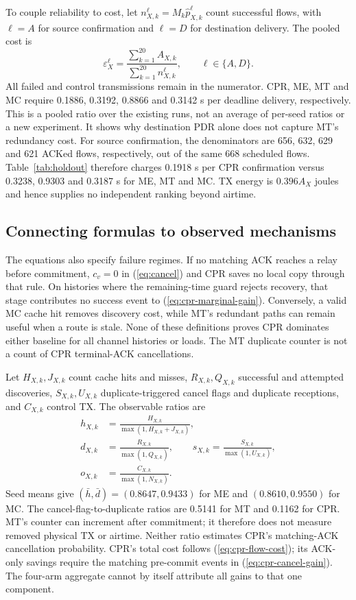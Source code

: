 \documentclass[conference,letterpaper,10pt]{IEEEtran}
\begin{document}
To couple reliability to cost, let
$n_{X,k}^{\ell}=M_k\widehat p_{X,k}^{\ell}$ count successful flows, with
$\ell=A$ for source confirmation and $\ell=D$ for destination delivery.
The pooled cost is
\begin{equation}
\varepsilon_X^\ell=
 \frac{\sum_{k=1}^{20}A_{X,k}}{\sum_{k=1}^{20}n_{X,k}^{\ell}},
 \qquad \ell\in\{A,D\}.
\label{eq:delivery-cost}
\end{equation}
All failed and control transmissions remain in the numerator. CPR, ME, MT
and MC require 0.1886, 0.3192, 0.8866 and 0.3142 s per deadline delivery,
respectively. This is a pooled ratio over the existing runs, not an average
of per-seed ratios or a new experiment. It shows why destination PDR alone
does not capture MT's redundancy cost.
For source confirmation, the denominators are 656, 632, 629 and 621 ACKed
flows, respectively, out of the same 668 scheduled flows. Table~\ref{tab:holdout}
therefore charges 0.1918 s per CPR confirmation versus 0.3238, 0.9303 and
0.3187 s for ME, MT and MC. TX energy is $0.396A_X$ joules and hence supplies
no independent ranking beyond airtime.

\subsection{Connecting formulas to observed mechanisms}
The equations also specify failure regimes. If no matching ACK reaches a
relay before commitment, $c_v=0$ in (\ref{eq:cancel}) and CPR saves no
local copy through that rule. On histories where the remaining-time guard
rejects recovery, that stage contributes no success event to
(\ref{eq:cpr-marginal-gain}). Conversely,
a valid MC cache hit removes discovery cost, while MT's redundant paths can
remain useful when a route is stale. None of these definitions proves CPR
dominates either baseline for all channel histories or loads.
The MT duplicate counter is not a count of CPR terminal-ACK cancellations.

Let $H_{X,k},J_{X,k}$ count cache hits and misses,
$R_{X,k},Q_{X,k}$ successful and attempted discoveries,
$S_{X,k},U_{X,k}$ duplicate-triggered cancel flags and duplicate receptions, and
$C_{X,k}$ control TX. The observable ratios are
\begin{equation}
\begin{aligned}
h_{X,k}&=\frac{H_{X,k}}{\max(1,H_{X,k}+J_{X,k})},\\
d_{X,k}&=\frac{R_{X,k}}{\max(1,Q_{X,k})},\qquad
s_{X,k}=\frac{S_{X,k}}{\max(1,U_{X,k})},\\
o_{X,k}&=\frac{C_{X,k}}{\max(1,N_{X,k})}.
\end{aligned}
\label{eq:mechanism-observables}
\end{equation}
Seed means give $(\bar h,\bar d)=(0.8647,0.9433)$ for ME and
$(0.8610,0.9550)$ for MC.
The cancel-flag-to-duplicate ratios are 0.5141 for MT and 0.1162 for CPR.
MT's counter can increment after commitment; it therefore does not measure
removed physical TX or airtime. Neither ratio estimates CPR's matching-ACK
cancellation probability. CPR's total cost follows
(\ref{eq:cpr-flow-cost}); its ACK-only savings require the matching
pre-commit events in (\ref{eq:cpr-cancel-gain}).
The four-arm aggregate cannot by itself attribute all gains to that one
component.
\end{document}

